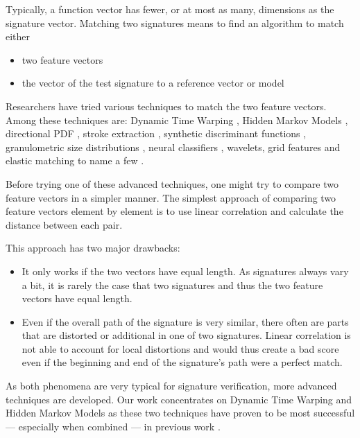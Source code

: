\documentclass[a4paper, oneside]{csthesis}
\begin{document}
Typically, a function vector has fewer, or at most as many, dimensions as the signature vector. Matching two signatures means to find an algorithm to match either
\begin{itemize}
\item two feature vectors
\item the vector of the test signature to a reference vector or model
\end{itemize}

Researchers have tried various techniques to match the two feature vectors. Among these techniques are: Dynamic Time Warping \cite{Herbst98onan, citeulike:891512}, Hidden Markov Models \cite{Justino00anoff-line}, directional PDF \cite{drouhard_1996_pr}, stroke extraction \cite{1047809}, synthetic discriminant functions \cite{Wilkinson:91}, granulometric size distributions \cite{615447}, neural classifiers \cite{Bajaj19971}, wavelets\cite{Ramesh1999217}, grid features\cite{Qi19941621} and elastic matching\cite{citeulike:941886} to name a few \cite{PiyushShanker:2007:OSV:1274199.1274423}.


Before trying one of these advanced techniques, one might try to compare two feature vectors in a simpler manner.
The simplest approach of comparing two feature vectors element by element is to use linear correlation \cite{Plamondon1989107} and calculate the distance between each pair.

This approach has two major drawbacks:
\begin{itemize}
\item It only works if the two vectors have equal length. As signatures always vary a bit, it is rarely the case that two signatures and thus the two feature vectors have equal length.
\item Even if the overall path of the signature is very similar, there often are parts that are distorted or additional in one of two signatures. Linear correlation is not able to account for local distortions and would thus create a bad score even if the beginning and end of the signature's path were a perfect match.
\end{itemize}

As both phenomena are very typical for signature verification, more advanced techniques are developed. Our work concentrates on Dynamic Time Warping and Hidden Markov Models as these two techniques have proven to be most successful --- especially when combined --- in previous work \cite{fierrez2005line, citeulike:885135, kashi1998hidden, PiyushShanker:2007:OSV:1274199.1274423,martens1996line}.
\end{document}
